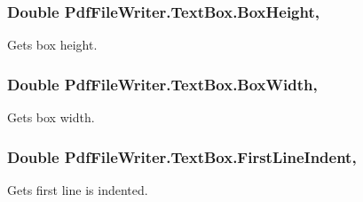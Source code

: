 \subsubsection[{\texorpdfstring{Box\+Height}{BoxHeight}}]{\setlength{\rightskip}{0pt plus 5cm}Double Pdf\+File\+Writer.\+Text\+Box.\+Box\+Height\hspace{0.3cm}{\ttfamily [get]}, {\ttfamily [set]}}\hypertarget{class_pdf_file_writer_1_1_text_box_af6b6dfaca0fb5e313ac4e2dd7a3e658c}{}\label{class_pdf_file_writer_1_1_text_box_af6b6dfaca0fb5e313ac4e2dd7a3e658c}


Gets box height. 

\subsubsection[{\texorpdfstring{Box\+Width}{BoxWidth}}]{\setlength{\rightskip}{0pt plus 5cm}Double Pdf\+File\+Writer.\+Text\+Box.\+Box\+Width\hspace{0.3cm}{\ttfamily [get]}, {\ttfamily [set]}}\hypertarget{class_pdf_file_writer_1_1_text_box_a34a203840d14e36e0ae0d80b3c2ee1c7}{}\label{class_pdf_file_writer_1_1_text_box_a34a203840d14e36e0ae0d80b3c2ee1c7}


Gets box width. 

\subsubsection[{\texorpdfstring{First\+Line\+Indent}{FirstLineIndent}}]{\setlength{\rightskip}{0pt plus 5cm}Double Pdf\+File\+Writer.\+Text\+Box.\+First\+Line\+Indent\hspace{0.3cm}{\ttfamily [get]}, {\ttfamily [set]}}\hypertarget{class_pdf_file_writer_1_1_text_box_a2fb4e8a5bcb730df655e813fe5fd2cf1}{}\label{class_pdf_file_writer_1_1_text_box_a2fb4e8a5bcb730df655e813fe5fd2cf1}


Gets first line is indented. 

